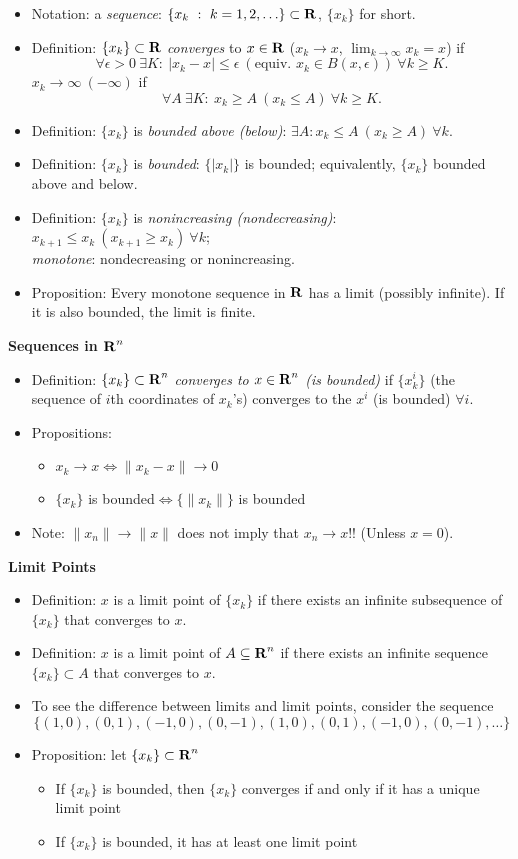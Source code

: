 \documentclass[11pt]{article}
\begin{document}
\begin{itemize}
\item Notation: a \emph{sequence}: $\{x_k\ :\ k=1,2,\ldots\}\subset\reals$, $\{x_k\}$ for short.
\item Definition: $\{x_k\}\subset{\mbox{\textbf{R}}}$ \emph{converges} to $x\in {\mbox{\textbf{R}}}$ ($x_k\rightarrow x$,
$\lim_{k\rightarrow\infty}x_k=x$) if
$$
\forall\epsilon>0\ \exists K:\ |x_k-x|\le\epsilon\ (\text{equiv.\ }x_k\in B(x,\epsilon))\ \forall k\ge K.
$$
$x_k\rightarrow\infty\ (-\infty)$ if
$$
\forall A\ \exists K:\ x_k\ge A\ (x_k\le A)\ \forall k\ge K.
$$
\item Definition: $\{x_k\}$ is \emph{bounded above (below)}:  $\exists A: x_k\le A\ (x_k\ge A)\
\forall k$.
\item Definition: $\{x_k\}$ is \emph{bounded}:  $\{|x_k|\}$ is bounded; equivalently, $\{x_k\}$ bounded
above and below.
\item Definition: $\{x_k\}$ is \emph{nonincreasing (nondecreasing)}:  $x_{k+1}\le x_k\
(x_{k+1}\ge x_k)\ \forall k$;\\
\emph{monotone}: nondecreasing or nonincreasing.
\item Proposition: Every monotone sequence in ${\mbox{\textbf{R}}}$ has a limit (possibly infinite). If it is also bounded, the
limit is finite.  
\end{itemize}
\textbf{Sequences in ${\mbox{\textbf{R}}}^n$}
\begin{itemize}
\item Definition: $\{x_k\}\subset{\mbox{\textbf{R}}}^n$ \emph{converges to $x\in{\mbox{\textbf{R}}}^n$ (is bounded)} if
$\{x_k^i\}$ (the sequence of $i$th coordinates of $x_k$'s) converges to the $x^i$ (is bounded) $\forall i$.
\item Propositions: \begin{itemize}
\item $x_k\rightarrow x\Leftrightarrow\|x_k-x\|\rightarrow0$
\item $\{x_k\}$ is bounded$\Leftrightarrow\{\|x_k\|\}$ is bounded
\end{itemize}
\item Note: $\|x_n\|\rightarrow\|x\|$ does not imply that $x_n\rightarrow x$!! (Unless $x=0$).
\end{itemize}
\textbf{Limit Points}
\begin{itemize}
\item Definition: $x$ is a limit point of $\{x_k\}$ if there exists an infinite subsequence of $\{x_k\}$ that
converges to $x$.
\item Definition: $x$ is a limit point of $A\subseteq{\mbox{\textbf{R}}}^n$ if there exists an infinite sequence $\{x_k\}\subset A$
that converges to $x$.
\item To see the difference between limits and limit points, consider the sequence
$$\{(1,0),(0,1),(-1,0),(0,-1),(1,0),(0,1),(-1,0),(0,-1),\ldots\}$$
\item Proposition: let $\{x_k\}\subset{\mbox{\textbf{R}}}^n$
\begin{itemize}
\item If $\{x_k\}$ is bounded, then $\{x_k\}$ converges if and only if it has a unique limit point
\item If $\{x_k\}$ is bounded, it has at least one limit point
\end{itemize}
\end{itemize}
\end{document}
